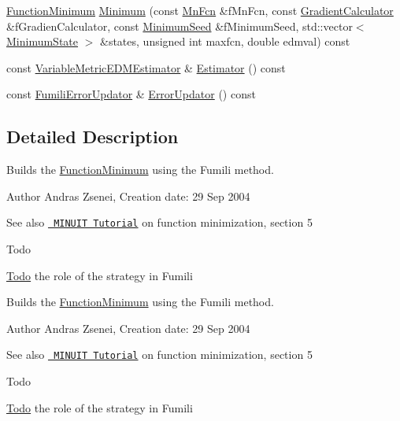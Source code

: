 \begin{DoxyCompactItemize}
\item 
\mbox{\hyperlink{classROOT_1_1Minuit2_1_1FunctionMinimum}{Function\+Minimum}} \mbox{\hyperlink{classROOT_1_1Minuit2_1_1FumiliBuilder_ac0df0ebc275b75e6a6831f102f1753d2}{Minimum}} (const \mbox{\hyperlink{classROOT_1_1Minuit2_1_1MnFcn}{Mn\+Fcn}} \&f\+Mn\+Fcn, const \mbox{\hyperlink{classROOT_1_1Minuit2_1_1GradientCalculator}{Gradient\+Calculator}} \&f\+Gradien\+Calculator, const \mbox{\hyperlink{classROOT_1_1Minuit2_1_1MinimumSeed}{Minimum\+Seed}} \&f\+Minimum\+Seed, std\+::vector$<$ \mbox{\hyperlink{classROOT_1_1Minuit2_1_1MinimumState}{Minimum\+State}} $>$ \&states, unsigned int maxfcn, double edmval) const
\item 
const \mbox{\hyperlink{classROOT_1_1Minuit2_1_1VariableMetricEDMEstimator}{Variable\+Metric\+E\+D\+M\+Estimator}} \& \mbox{\hyperlink{classROOT_1_1Minuit2_1_1FumiliBuilder_a1e7bd763cd6677dd08d528079143d7b2}{Estimator}} () const
\item 
const \mbox{\hyperlink{classROOT_1_1Minuit2_1_1FumiliErrorUpdator}{Fumili\+Error\+Updator}} \& \mbox{\hyperlink{classROOT_1_1Minuit2_1_1FumiliBuilder_a03face0b120b333aea0b49d5531518ef}{Error\+Updator}} () const
\end{DoxyCompactItemize}


\subsection{Detailed Description}
Builds the \mbox{\hyperlink{classROOT_1_1Minuit2_1_1FunctionMinimum}{Function\+Minimum}} using the Fumili method.

\begin{DoxyAuthor}{Author}
Andras Zsenei, Creation date\+: 29 Sep 2004
\end{DoxyAuthor}
\begin{DoxySeeAlso}{See also}
\href{http://www.cern.ch/winkler/minuit/tutorial/mntutorial.pdf}{\texttt{ M\+I\+N\+U\+IT Tutorial}} on function minimization, section 5
\end{DoxySeeAlso}
\begin{DoxyRefDesc}{Todo}
\item[\mbox{\hyperlink{todo__todo000002}{Todo}}]the role of the strategy in Fumili\end{DoxyRefDesc}


Builds the \mbox{\hyperlink{classROOT_1_1Minuit2_1_1FunctionMinimum}{Function\+Minimum}} using the Fumili method.

\begin{DoxyAuthor}{Author}
Andras Zsenei, Creation date\+: 29 Sep 2004
\end{DoxyAuthor}
\begin{DoxySeeAlso}{See also}
\href{http://www.cern.ch/winkler/minuit/tutorial/mntutorial.pdf}{\texttt{ M\+I\+N\+U\+IT Tutorial}} on function minimization, section 5
\end{DoxySeeAlso}
\begin{DoxyRefDesc}{Todo}
\item[\mbox{\hyperlink{todo__todo000014}{Todo}}]the role of the strategy in Fumili\end{DoxyRefDesc}


